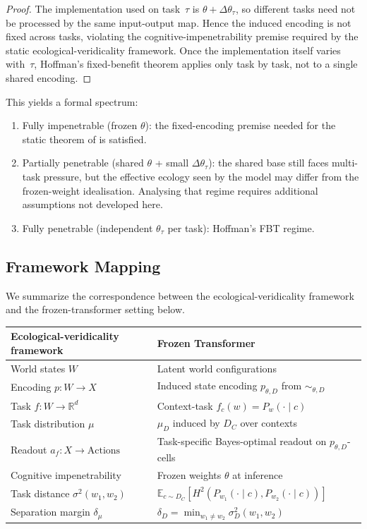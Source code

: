 \documentclass[twoside,11pt]{article}
\newcommand{\dmu}{\delta_\mu}
\newcommand{\sigmasq}{\sigma^2}
\newcommand{\E}{\mathbb{E}}
\newcommand{\R}{\mathbb{R}}
\newcommand{\Hsq}{H^2}
\begin{document}
\begin{proof}
The implementation used on task~$\tau$ is $\theta+\Delta\theta_\tau$, so different tasks need not be processed by the same input-output map. Hence the induced encoding is not fixed across tasks, violating the cognitive-impenetrability premise required by the static ecological-veridicality framework. Once the implementation itself varies with~$\tau$, Hoffman's fixed-benefit theorem applies only task by task, not to a single shared encoding.
\end{proof}

\begin{remark}
This yields a formal spectrum:
\begin{enumerate}[label=(\alph*)]
\item Fully impenetrable (frozen $\theta$): the fixed-encoding premise needed for the static theorem of \citet[Theorem~4.1]{dallariva_2026} is satisfied.
\item Partially penetrable (shared $\theta$ + small $\Delta\theta_\tau$): the shared base still faces multi-task pressure, but the effective ecology seen by the model may differ from the frozen-weight idealisation. Analysing that regime requires additional assumptions not developed here.
\item Fully penetrable (independent $\theta_\tau$ per task): Hoffman's FBT regime.
\end{enumerate}
\end{remark}

\subsection{Framework Mapping}

We summarize the correspondence between the ecological-veridicality framework and the frozen-transformer setting below.

\begin{center}
\begin{tabular}{@{}ll@{}}
\toprule
Ecological-veridicality framework & Frozen Transformer \\
\midrule
World states $W$ & Latent world configurations \\
Encoding $p \colon W \to X$ & Induced state encoding $p_{\theta,D}$ from $\sim_{\theta,D}$ \\
Task $f \colon W \to \R^d$ & Context-task $f_c(w) = P_w(\cdot\mid c)$ \\
Task distribution $\mu$ & $\mu_D$ induced by $D_C$ over contexts \\
Readout $a_f \colon X \to \text{Actions}$ & Task-specific Bayes-optimal readout on $p_{\theta,D}$-cells \\
Cognitive impenetrability & Frozen weights $\theta$ at inference \\
Task distance $\sigmasq(w_1,w_2)$ & $\E_{c\sim D_C}[\Hsq(P_{w_1}(\cdot\mid c), P_{w_2}(\cdot\mid c))]$ \\
Separation margin $\dmu$ & $\delta_D = \min_{w_1\neq w_2} \sigmasq_D(w_1,w_2)$ \\
\bottomrule
\end{tabular}
\end{center}
\end{document}
